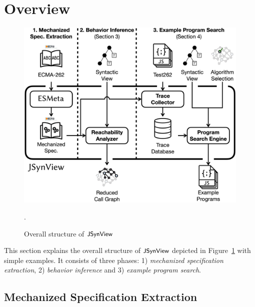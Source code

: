 \section{Overview}\label{sec:overview}

\begin{figure}
  \centering
  \includegraphics[width=\columnwidth]{img/overall.png}
  \caption{Overall structure of $\textsf{\small JSynView}$}
  \vspace*{-1em}
  \label{fig:overall}.
\end{figure}

This section explains the overall structure of $\textsf{\small JSynView}$ depicted in
Figure~\ref{fig:overall} with simple examples.  It consists of three phases: 1)
\textit{mechanized specification extraction}, 2) \textit{behavior inference} and
3) \textit{example program search}.

\subsection{Mechanized Specification Extraction}\label{sec:extract-spec}

